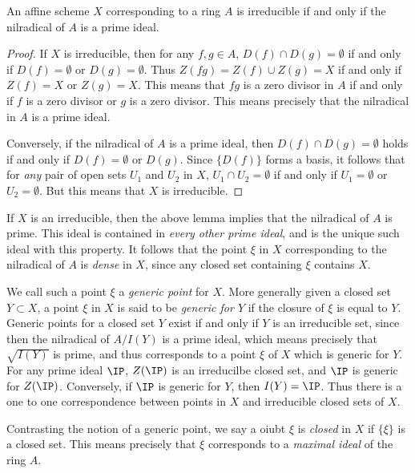 \begin{lemma}
    An affine scheme $X$ corresponding to a ring $A$ is irreducible if and only if the nilradical of $A$ is a prime ideal.
\end{lemma}
\begin{proof}
    If $X$ is irreducible, then for any $f,g \in A$, $D(f) \cap D(g) = \emptyset$ if and only if $D(f) = \emptyset$ or $D(g) = \emptyset$. Thus $Z(fg) = Z(f) \cup Z(g) = X$ if and only if $Z(f) = X$ or $Z(g) = X$. This means that $fg$ is a zero divisor in $A$ if and only if $f$ is a zero divisor or $g$ is a zero divisor. This means precisely that the nilradical in $A$ is a prime ideal.

    Conversely, if the nilradical of $A$ is a prime ideal, then $D(f) \cap D(g) = \emptyset$ holds if and only if $D(f) = \emptyset$ or $D(g)$. Since $\{ D(f) \}$ forms a basis, it follows that for \emph{any} pair of open sets $U_1$ and $U_2$ in $X$, $U_1 \cap U_2 = \emptyset$ if and only if $U_1 = \emptyset$ or $U_2 = \emptyset$. But this means that $X$ is irreducible.
\end{proof}

If $X$ is an irreducible, then the above lemma implies that the nilradical of $A$ is prime. This ideal is contained in \emph{every other prime ideal}, and is the unique such ideal with this property. It follows that the point $\xi$ in $X$ corresponding to the nilradical of $A$ is \emph{dense} in $X$, since any closed set containing $\xi$ contains $X$.

We call such a point $\xi$ a \emph{generic point} for $X$. More generally given a closed set $Y \subset X$, a point $\xi$ in $X$ is said to be \emph{generic for $Y$} if the closure of $\xi$ is equal to $Y$. Generic points for a closed set $Y$ exist if and only if $Y$ is an irreducible set, since then the nilradical of $A/I(Y)$ is a prime ideal, which means precisely that $\sqrt{I(Y)}$ is prime, and thus corresponds to a point $\xi$ of $X$ which is generic for $Y$. For any prime ideal $\IP$, $Z(\IP)$ is an irreducilbe closed set, and $\IP$ is generic for $Z(\IP)$. Conversely, if $\IP$ is generic for $Y$, then $I(Y) = \IP$. Thus there is a one to one correspondence between points in $X$ and irreducible closed sets of $X$.

Contrasting the notion of a generic point, we say a oiubt $\xi$ is \emph{closed} in $X$ if $\{ \xi \}$ is a closed set. This means precisely that $\xi$ corresponds to a \emph{maximal ideal} of the ring $A$.

